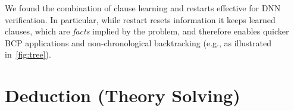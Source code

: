 \documentclass[oneside,11pt,dvipsnames]{book}
\numberwithin{equation}{section}
\theoremstyle{definition}
\theoremstyle{remark}
\newcommand{\tvn}[1]{\iftoggle{usecomment}{{\color{red}{[TVN]: #1}}}{}}
\newcommand{\mbd}[1]{\iftoggle{usecomment}{{\color{magenta}{[MBD]: #1}}}{}}
\newcommand{\tool}{\texttt{NeuralSAT}}
\begin{document}
We found the combination of clause learning and restarts effective for DNN verification. In particular, while restart resets information  it keeps learned clauses, which  are \emph{facts} implied by the problem, and therefore enables quicker BCP applications and non-chronological backtracking (e.g., as illustrated in~\autoref{fig:tree}).





\section{Deduction (Theory Solving)}\label{sec:deduction}
\end{document}
